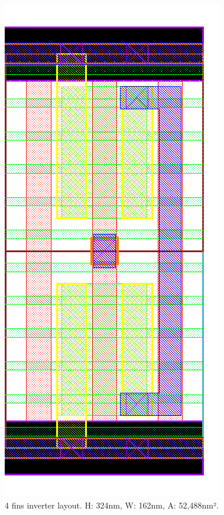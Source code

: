 \documentclass[pgmicro,diss,english]{iiufrgs}
\begin{document}
\begin{figure}[]
\centering
\includegraphics[width=\textwidth,height=\textheight,keepaspectratio]{INV4F.png}
\caption{4 fins inverter layout. H: 324nm, W: 162nm, A: 52,488nm².}
\label{fig:INV4F}
\end{figure}
\end{document}
